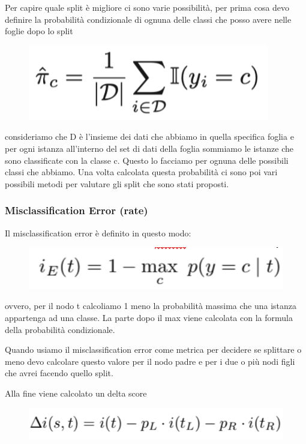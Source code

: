 \documentclass[14pt]{extreport}
\begin{document}
Per capire quale split è migliore ci sono varie possibilità, per prima cosa devo definire la probabilità condizionale di ognuna delle classi che posso
avere nelle foglie dopo lo split


\begin{figure}[H]
	\centering
	\includegraphics[width=0.7\linewidth]{578.jpeg}
\end{figure}

consideriamo che D è l’insieme dei dati che abbiamo in quella specifica foglia e per ogni istanza all’interno del set di dati della foglia sommiamo le
istanze che sono classificate con la classe c. Questo lo facciamo per ognuna delle possibili classi che abbiamo. Una volta calcolata questa
probabilità ci sono poi vari possibili metodi per valutare gli split che sono stati proposti.

\subsubsection{Misclassification Error (rate)}

Il misclassification error è definito in questo modo:


\begin{figure}[H]
	\centering
	\includegraphics[width=0.7\linewidth]{579.jpeg}
\end{figure}

ovvero, per il nodo t calcoliamo 1 meno la probabilità massima che una istanza appartenga ad una classe. La parte dopo il max viene calcolata con la
formula della probabilità condizionale.

Quando usiamo il misclassification error come metrica per decidere se splittare o meno devo calcolare questo valore per il nodo padre e per i due o
più nodi figli che avrei facendo quello split.

Alla fine viene calcolato un delta score

\begin{figure}[H]
	\centering
	\includegraphics[width=0.7\linewidth]{580.jpeg}
\end{figure}
\end{document}
